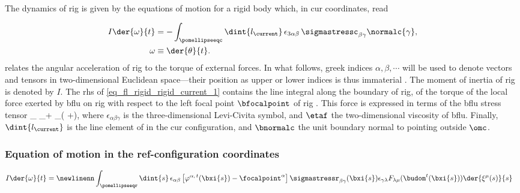 The dynamics of  \ac{rig} is given by the equations of motion for a rigid body which, in \ac{cur} coordinates, read \cite{goldsteinClassicalMechanics2004}

\begin{align}
        \label{eq_fl_rigid_rigid_current_1}
        I         \der{\omega}{t}
               & =                                                                                             - \int_\pomellipseeqc \dint{l_\current} \, \epsilon_{3 \alpha \beta} \, \sigmastressc_{\beta \gamma} \normalc{\gamma} , \\
        \label{eq_fl_rigid_rigid_current_2}
        \omega & \equiv \der{\theta}{t}.
\end{align}
 relates the angular acceleration of \ac{rig} to the torque of external forces.
In what follows, greek indices $\alpha, \beta, \cdots$ will be used to denote vectors and tensors in  two-dimensional Euclidean space---their position as upper or lower indices is thus immaterial \cite{marchiafavaAppuntiDiGeometria2005,landauTheoryElasticity1986}.
The moment of inertia of \ac{rig} is denoted by $I$. The \ac{rhs} of \cref{eq_fl_rigid_rigid_current_1} contains the line integral along the boundary of \ac{rig}, of the torque of the local force exerted by  \ac{bflu} on  \ac{rig} with respect to the left focal point $\bfocalpoint$ of \ac{rig} \cite{landauFluidMechanics1987}. This force is expressed in terms of the \ac{bflu} stress tensor \cite{landauFluidMechanics1987}
\be
\label{eq_strees_tensor_fluid}
\sigmastressc_{\alpha \beta } \equiv \sigmafc \delta_{\alpha \beta}+ \eta_\fluid\left( \pderc{ \vfc^\alpha}{\beta} +\pderc{ \vfc^\beta}{\alpha}\right),
\ee
where $\epsilon_{\alpha \beta \gamma}$ is the three-dimensional Levi-Civita symbol, and $\etaf$ the two-dimensional viscosity of \ac{bflu}. Finally,   $\dint{l_\current}$ is the line element of \pomellipsec in the \ac{cur} configuration, and $\bnormalc$ the unit boundary normal to \pomellipsec pointing outside $\omc$.



\subsubsection{Equation of motion in the \acl{ref}-configuration coordinates}\label{sec_rigid_body_body_reference}

\bw
\begin{align}
        \label{eq_fl_rigid_rigid_reference}
        I \der{\omega}{t} & =                                               \newlinenn
        \int_\pomellipseeqr \dint{s} \, \epsilon_{\alpha \beta} \left[ \varphi^{\alpha, \, t}(\bxi{s}) - \focalpoint^\alpha \right] \sigmastressr_{\beta \gamma}(\bxi{s}) \epsilon_{\gamma \lambda} F_{\lambda \mu}(\budom^t(\bxi{s})) \der{\xi^\mu(s)}{s}
\end{align}
\ew

